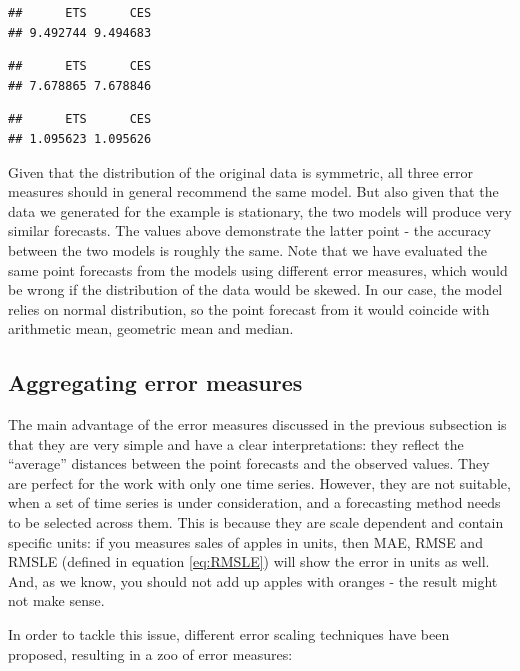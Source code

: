 \documentclass[
]{book}
\theoremstyle{definition}
\theoremstyle{definition}
\theoremstyle{definition}
\theoremstyle{definition}
\theoremstyle{remark}
\begin{document}
\begin{verbatim}
##      ETS      CES 
## 9.492744 9.494683
\end{verbatim}

\begin{verbatim}
##      ETS      CES 
## 7.678865 7.678846
\end{verbatim}

\begin{verbatim}
##      ETS      CES 
## 1.095623 1.095626
\end{verbatim}

Given that the distribution of the original data is symmetric, all three error measures should in general recommend the same model. But also given that the data we generated for the example is stationary, the two models will produce very similar forecasts. The values above demonstrate the latter point - the accuracy between the two models is roughly the same. Note that we have evaluated the same point forecasts from the models using different error measures, which would be wrong if the distribution of the data would be skewed. In our case, the model relies on normal distribution, so the point forecast from it would coincide with arithmetic mean, geometric mean and median.

\hypertarget{errorMeasuresAggregate}{%
\subsection{Aggregating error measures}\label{errorMeasuresAggregate}}

The main advantage of the error measures discussed in the previous subsection is that they are very simple and have a clear interpretations: they reflect the ``average'' distances between the point forecasts and the observed values. They are perfect for the work with only one time series. However, they are not suitable, when a set of time series is under consideration, and a forecasting method needs to be selected across them. This is because they are scale dependent and contain specific units: if you measures sales of apples in units, then MAE, RMSE and RMSLE (defined in equation \eqref{eq:RMSLE}) will show the error in units as well. And, as we know, you should not add up apples with oranges - the result might not make sense.

In order to tackle this issue, different error scaling techniques have been proposed, resulting in a zoo of error measures:
\end{document}
